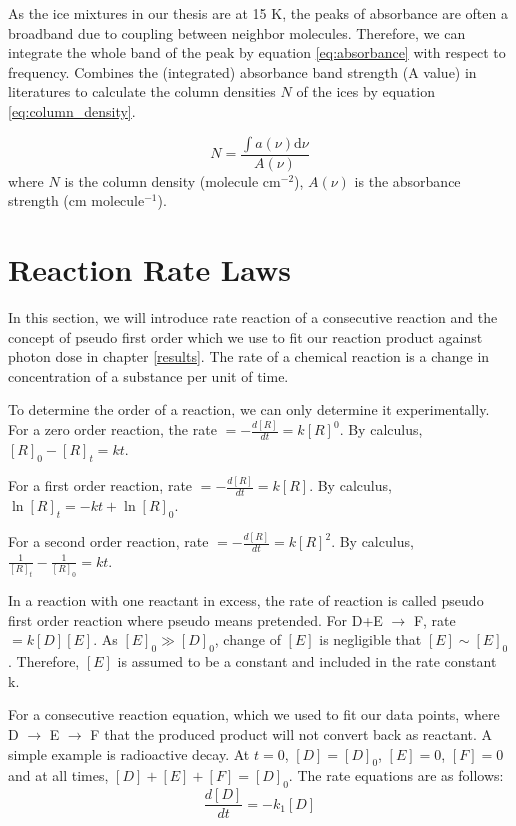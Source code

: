 As the ice mixtures in our thesis are at 15 K, the peaks of absorbance are often a broadband due to coupling between neighbor molecules. Therefore, we can integrate the whole band of the peak by equation \ref{eq:absorbance} with respect to frequency. Combines the (integrated) absorbance band strength (A value) in literatures to calculate the column densities $N$ of the ices by equation \ref{eq:column_density}.

\begin{equation}
N = \frac{\int a(\nu) \mathrm{d}\nu}{A(\nu)}
\label{eq:column_density}
\end{equation}
where $N$ is the column density (molecule cm$^{-2}$), $A(\nu)$ is the absorbance strength (cm molecule$^{-1}$).

\section{Reaction Rate Laws}
\label{sec:Reaction_Rate_Laws}
In this section, we will introduce rate reaction of a consecutive reaction and the concept of pseudo first order which we use to fit our reaction product against photon dose in chapter \ref{results}. The rate of a chemical reaction is a change in concentration of a substance per unit of time.

To determine the order of a reaction, we can only determine it experimentally.
For a zero order reaction, the rate $ = - \frac{d[R]}{dt} = k[R]^0$. By calculus, $[R]_0 - [R]_t = kt$.

For a first order reaction, rate $ = - \frac{d[R]}{dt} = k[R]$. By calculus, $\ln [R]_t = -kt + \ln [R]_0$.

For a second order reaction, rate $ = - \frac{d[R]}{dt} = k[R]^2$. By calculus, $\frac{1}{[R]_t} - \frac{1}{[R]_0} = kt$.

In a reaction with one reactant in excess, the rate of reaction is called pseudo first order reaction where pseudo means pretended. For D+E $\rightarrow$ F, rate $ = k[D][E]$. As $[E]_0 \gg [D]_0$, change of $[E]$ is negligible that $[E] \sim [E]_0$. Therefore, $[E]$ is assumed to be a constant and included in the rate constant k.

For a consecutive reaction equation, which we used to fit our data points, where D $\rightarrow$ E $\rightarrow$ F that the produced product will not convert back as reactant. A simple example is radioactive decay. At $t=0$, $[D]=[D]_0$, $[E]=0$, $[F]=0$ and at all times, $[D]+[E]+[F]=[D]_0$. The rate equations are as follows:
\begin{equation}
\frac{ d[D]}{dt} = - k_1 [D]
\label{eq:rate1}
\end{equation}

